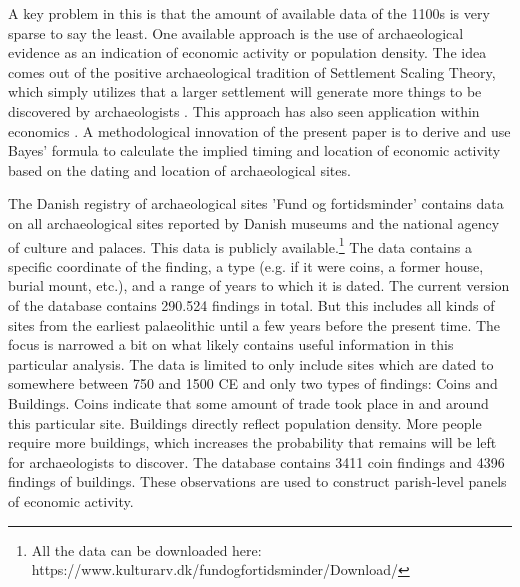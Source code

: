 \documentclass[11pt]{article}
\begin{document}
A key problem in this is that the amount of available data of the 1100s is very sparse to say the least. One available approach is the use of archaeological evidence as an indication of economic activity or population density. The idea comes out of the positive archaeological tradition of Settlement Scaling Theory, which simply utilizes that a larger settlement will generate more things to be discovered by archaeologists \citep{Ortman2020}. This approach has also seen application within economics \citep{Davis2002, Bakker2021Phonecians, Allen2023, Barjamovic2019}. A methodological innovation of the present paper is to derive and use Bayes' formula to calculate the implied timing and location of economic activity based on the dating and location of archaeological sites.

The Danish registry of archaeological sites 'Fund og fortidsminder' contains data on all archaeological sites reported by Danish museums and the national agency of culture and palaces. This data is publicly available.\footnote{All the data can be downloaded here: https://www.kulturarv.dk/fundogfortidsminder/Download/} The data contains a specific coordinate of the finding, a type (e.g. if it were coins, a former house, burial mount, etc.), and a range of years to which it is dated. The current version of the database contains 290.524 findings in total. But this includes all kinds of sites from the earliest palaeolithic until a few years before the present time. The focus is narrowed a bit on what likely contains useful information in this particular analysis. The data is limited to only include sites which are dated to somewhere between 750 and 1500 CE and only two types of findings: Coins and Buildings. Coins indicate that some amount of trade took place in and around this particular site. Buildings directly reflect population density. More people require more buildings, which increases the probability that remains will be left for archaeologists to discover. The database contains 3411 coin findings and 4396 findings of buildings. These observations are used to construct parish-level panels of economic activity.
\end{document}
